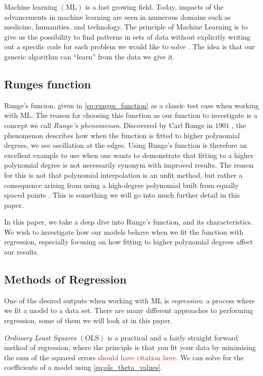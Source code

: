 
 Machine learning $\left(\mathrm{ML}\right)$ is a fast growing field. Today, impacts of the advancements in machine learning are seen in numerous domains such as medicine, humanities, and technology. The principle of Machine Learning is to give us the possibility to find patterns in sets of data without explicitly writing out a specific code for each problem we would like to solve \cite{noauthor_machinelearninguiodocbookmllecturebookpdf_nodate}. The idea is that our generic algorithm can ``learn'' from the data we give it. 

 \subsection{Runges function}
 Runge's funcion, given in \autoref{eq:runges_function} as a classic test case when working with ML. The reason for choosing this function as our function to investigate is a concept we call \textit{Runge's phenomenon}. Discovered by Carl Runge in $1901$ \cite{runges_phenomenon}, the phenomenon describes how when the function is fitted to higher polynomial degrees, we see oscillation at the edges. Using Runge's function is therefore an excellent example to use when one wants to demonstrate that fitting to a higher polynomial degree is not necessarily synonym with improved results. The reason for this is not that polynomial interpolation is an unfit method, but rather a consequence arising from using a high-degree polynomial built from equally spaced points \cite{interpolationcal_runges_2026}. This is something we will go into much further detail in this paper.

 In this paper, we take a deep dive into Runge's function, and its characteristics. We wish to investigate how our models behave when we fit the function with regression, especially focusing on how fitting to higher polynomial degrees affect our results.

\subsection{Methods of Regression}
 One of the desired outputs when working with ML is \textit{regression}: a process where we fit a model to a data set. There are many different approaches to performing regression, some of them we will look at in this paper.

 \textit{Ordinary Least Squares} $\left(\mathrm{OLS}\right)$ is a practical and a fairly straight forward method of regression, where the principle is that you fit your data by minimising the sum of the squared errors \textcolor{red}{should have citation here}. We can solve for the coefficients of a model using \autoref{eq:ols_theta_values}.


